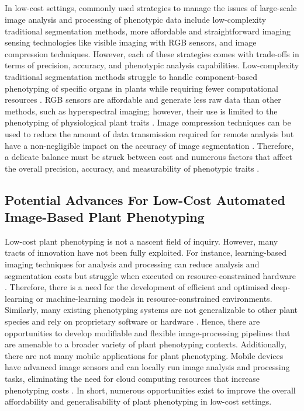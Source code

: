 \subparagraph{}
In low-cost settings, commonly used strategies to manage the issues of large-scale image analysis and processing of phenotypic data include low-complexity traditional segmentation methods, more affordable and straightforward imaging sensing technologies like visible imaging with RGB sensors, and image compression techniques. However, each of these strategies comes with trade-offs in terms of precision, accuracy, and phenotypic analysis capabilities. Low-complexity traditional segmentation methods struggle to handle component-based phenotyping of specific organs in plants while requiring fewer computational resources \cite{choudhurySegmentationTechniquesChallenges2020}. RGB sensors are affordable and generate less raw data than other methods, such as hyperspectral imaging; however, their use is limited to the phenotyping of physiological plant traits \cite{liReviewImagingTechniques2014}. Image compression techniques can be used to reduce the amount of data transmission required for remote analysis but have a non-negligible impact on the accuracy of image segmentation \cite{minerviniApplicationawareImageCompression2013}. Therefore, a delicate balance must be struck between cost and numerous factors that affect the overall precision, accuracy, and measurability of phenotypic traits \cite{muller-linowPlantScreenMobile2019}.

\subsection{Potential Advances For Low-Cost Automated Image-Based Plant Phenotyping}
Low-cost plant phenotyping is not a nascent field of inquiry. However, many tracts of innovation have not been fully exploited. For instance, learning-based imaging techniques for analysis and processing can reduce analysis and segmentation costs but struggle when executed on resource-constrained hardware \cite{nabwireReviewApplicationArtificial2021}. Therefore, there is a need for the development of efficient and optimised deep-learning or machine-learning models in resource-constrained environments. Similarly, many existing phenotyping systems are not generalizable to other plant species \cite{liReviewImagingTechniques2014, arvidssonGrowthPhenotypingPipeline2011a} and rely on proprietary software or hardware \cite{czedik-eysenbergPhenoBoxFlexibleAutomated2018}. Hence, there are opportunities to develop modifiable and flexible image-processing pipelines that are amenable to a broader variety of plant phenotyping contexts. Additionally, there are not many mobile applications for plant phenotyping. Mobile devices have advanced image sensors and can locally run image analysis and processing tasks, eliminating the need for cloud computing resources that increase phenotyping costs \cite{muller-linowPlantScreenMobile2019}. In short, numerous opportunities exist to improve the overall affordability and generalisability of plant phenotyping in low-cost settings.